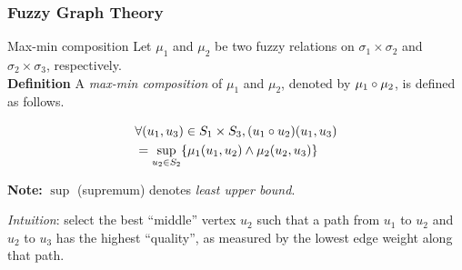 \begin{frame}
	\frametitle{Fuzzy Graph Theory}

	\begin{block}{Max-min composition}
		Let $\mu_1$ and $\mu_2$ be two fuzzy relations on $\sigma_1 \times \sigma_2$ and $\sigma_2 \times \sigma_3$, respectively. \\
		\textbf{Definition} A \textit{max-min composition} of $\mu_1$ and $\mu_2$, denoted by $\mu_1 \circ \mu_2$, is defined as follows.

		\begin{equation}
			\begin{aligned}
				& \forall (u_1, u_3) \in S_1 \times S_3, (u_1 \circ u_2) (u_1, u_3) \\
				& = \sup_{u_2 \in S_2}\{ \mu_1(u_1, u_2) \land \mu_2(u_2, u_3) \}
			\end{aligned}
			\label{eq:min_max_composition}
		\end{equation}

		\textbf{Note:} $\sup$ (supremum) denotes \textit{least upper bound}.

		\vspace*{2em}

		\textit{Intuition}: select the best ``middle'' vertex $u_2$ such that a path from $u_1$ to $u_2$ and $u_2$ to $u_3$ has the highest ``quality'', as measured by the lowest edge weight along that path.
	\end{block}
\end{frame}
